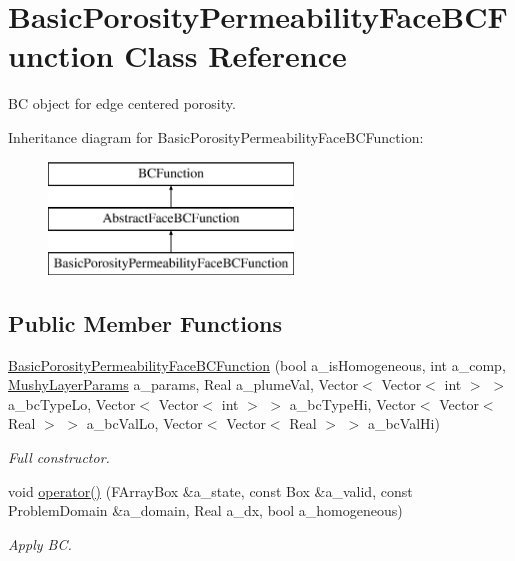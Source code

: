 \hypertarget{class_basic_porosity_permeability_face_b_c_function}{\section{Basic\-Porosity\-Permeability\-Face\-B\-C\-Function Class Reference}
\label{class_basic_porosity_permeability_face_b_c_function}
}


B\-C object for edge centered porosity.  


Inheritance diagram for Basic\-Porosity\-Permeability\-Face\-B\-C\-Function\-:\begin{figure}[H]
\begin{center}
\leavevmode
\includegraphics[height=3.000000cm]{class_basic_porosity_permeability_face_b_c_function}
\end{center}
\end{figure}
\subsection*{Public Member Functions}
\begin{DoxyCompactItemize}
\item 
\hypertarget{class_basic_porosity_permeability_face_b_c_function_a9c4f07215d310756b2cb65d57566c10c}{\hyperlink{class_basic_porosity_permeability_face_b_c_function_a9c4f07215d310756b2cb65d57566c10c}{Basic\-Porosity\-Permeability\-Face\-B\-C\-Function} (bool a\-\_\-is\-Homogeneous, int a\-\_\-comp, \hyperlink{class_mushy_layer_params}{Mushy\-Layer\-Params} a\-\_\-params, Real a\-\_\-plume\-Val, Vector$<$ Vector$<$ int $>$ $>$ a\-\_\-bc\-Type\-Lo, Vector$<$ Vector$<$ int $>$ $>$ a\-\_\-bc\-Type\-Hi, Vector$<$ Vector$<$ Real $>$ $>$ a\-\_\-bc\-Val\-Lo, Vector$<$ Vector$<$ Real $>$ $>$ a\-\_\-bc\-Val\-Hi)}\label{class_basic_porosity_permeability_face_b_c_function_a9c4f07215d310756b2cb65d57566c10c}

\begin{DoxyCompactList}\small\item\em Full constructor. \end{DoxyCompactList}\item 
\hypertarget{class_basic_porosity_permeability_face_b_c_function_a1acbb0ff29e6fe27f3a0907c611bddf2}{void \hyperlink{class_basic_porosity_permeability_face_b_c_function_a1acbb0ff29e6fe27f3a0907c611bddf2}{operator()} (F\-Array\-Box \&a\-\_\-state, const Box \&a\-\_\-valid, const Problem\-Domain \&a\-\_\-domain, Real a\-\_\-dx, bool a\-\_\-homogeneous)}\label{class_basic_porosity_permeability_face_b_c_function_a1acbb0ff29e6fe27f3a0907c611bddf2}

\begin{DoxyCompactList}\small\item\em Apply B\-C. \end{DoxyCompactList}\end{DoxyCompactItemize}
